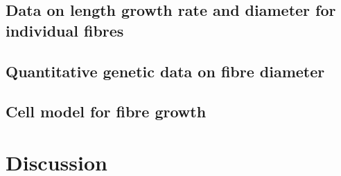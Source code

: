 \documentclass[titlepage]{article}  %
\begin{document}
\subsection{Data on length growth rate and diameter for individual fibres}

\subsection{Quantitative genetic data on fibre diameter}

\subsection{Cell model for fibre growth}

\section{Discussion}
\end{document}
